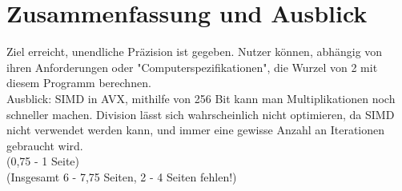 \documentclass[course=erap]{aspdoc}
\begin{document}
\section{Zusammenfassung und Ausblick}
Ziel erreicht, unendliche Präzision ist gegeben. Nutzer können, abhängig von ihren Anforderungen oder "Computerspezifikationen", die Wurzel von 2 mit diesem Programm berechnen. \\
Ausblick: SIMD in AVX, mithilfe von 256 Bit kann man Multiplikationen noch schneller machen. Division lässt sich wahrscheinlich nicht optimieren, da SIMD nicht verwendet werden kann, 
und immer eine gewisse Anzahl an Iterationen gebraucht wird. \\
(0,75 - 1 Seite) \\
(Insgesamt 6 - 7,75 Seiten, 2 - 4 Seiten fehlen!)


{}
\end{document}
